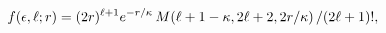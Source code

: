 \[\mathop{f\/}\nolimits\!\left(\epsilon,\ell;r\right)=(2r)^{\ell+1}e^{-r/\kappa}%
\mathop{M\/}\nolimits\!\left(\ell+1-\kappa,2\ell+2,2r/\kappa\right)/{(2\ell+1)%
!},\]